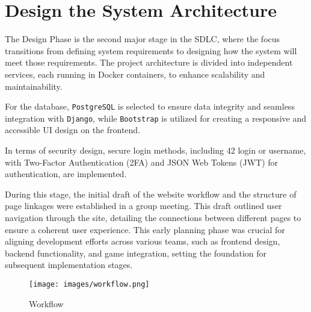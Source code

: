 \section{Design the System Architecture}
The Design Phase is the second major stage in the SDLC, where the focus transitions from defining system requirements to designing how the system will meet those requirements. The project architecture is divided into independent services, each running in Docker containers, to enhance scalability and maintainability.

For the database, \texttt{PostgreSQL} is selected to ensure data integrity and seamless integration with \texttt{Django}, while \texttt{Bootstrap} is utilized for creating a responsive and accessible UI design on the frontend.

In terms of security design, secure login methods, including 42 login or username, with Two-Factor Authentication (2FA) and JSON Web Tokens (JWT) for authentication, are implemented.

During this stage, the initial draft of the website workflow and the structure of page linkages were established in a group meeting. This draft outlined user navigation through the site, detailing the connections between different pages to ensure a coherent user experience. This early planning phase was crucial for aligning development efforts across various teams, such as frontend design, backend functionality, and game integration, setting the foundation for subsequent implementation stages.

\begin{figure}[H]
    \texttt{[image: images/workflow.png]}
    \caption{ Workflow }
    \label{fig:workflow}
\end{figure}


